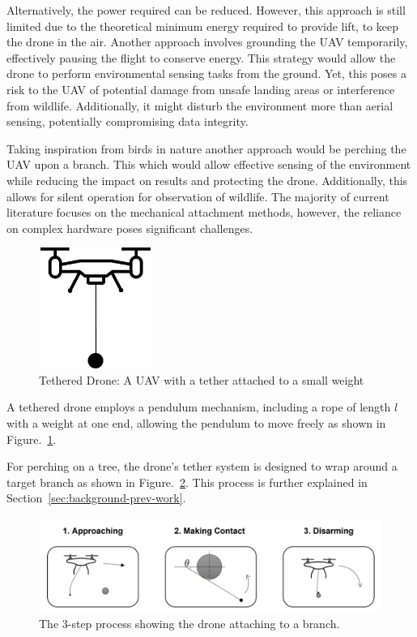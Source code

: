 Alternatively, the power required can be reduced.
However, this approach is still limited due to the theoretical minimum energy required to provide lift, to keep the drone in the air.
Another approach involves grounding the UAV temporarily, effectively pausing the flight to conserve energy.
This strategy would allow the drone to perform environmental sensing tasks from the ground.
Yet, this poses a risk to the UAV of potential damage from unsafe landing areas or interference from wildlife.
Additionally, it might disturb the environment more than aerial sensing, potentially compromising data integrity.

Taking inspiration from birds in nature another approach would be perching the UAV upon a branch.
This which would allow effective sensing of the environment while reducing the impact on results and protecting the drone.
Additionally, this allows for silent operation for observation of wildlife.
The majority of current literature focuses on the mechanical attachment methods, however, the reliance on complex hardware poses significant challenges.

\begin{figure}[H]
  \centering
  \includegraphics[width=0.33\textwidth]{introduction/TetheredDrone.drawio.png}
  \caption{Tethered Drone: A UAV with a tether attached to a small weight}
\label{fig:intro-tethered-drone}
\end{figure}

A tethered drone employs a pendulum mechanism, including a rope of length $l$ with a weight at one end, allowing the pendulum to move freely as shown in Figure.~\ref{fig:intro-tethered-drone}.

For perching on a tree, the drone's tether system is designed to wrap around a target branch as shown in Figure.~\ref{fig:intro-wrapping}.
This process is further explained in Section~\ref{sec:background-prev-work}.

\begin{figure}[htbp]
  \centering
  \includegraphics[width=\textwidth]{introduction/dronePerching.png}
  \caption{The 3-step process showing the drone attaching to a branch.}
\label{fig:intro-wrapping}
\end{figure}

